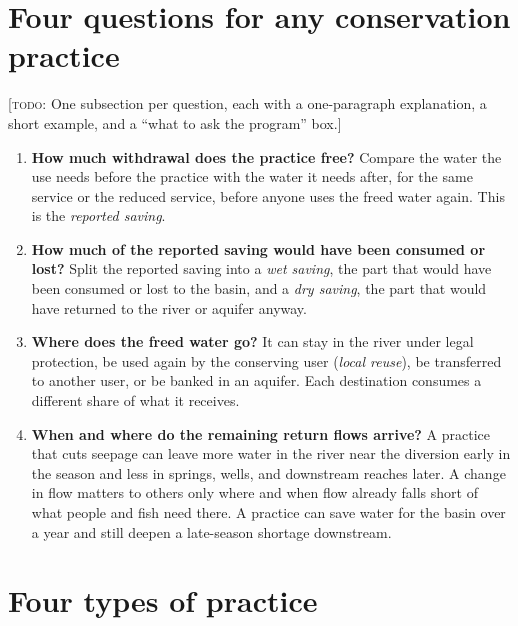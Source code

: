 \documentclass[11pt]{article}
\newcommand{\todo}[1]{\textcolor{orange!70!black}{[\textsc{todo}: #1]}}
\begin{document}
\section{Four questions for any conservation practice}\label{sec:questions}

\todo{One subsection per question, each with a one-paragraph explanation, a short example, and a ``what to ask the program'' box.}

\begin{enumerate}
  \item \textbf{How much withdrawal does the practice free?} Compare the water the use needs before the practice with the water it needs after, for the same service or the reduced service, before anyone uses the freed water again. This is the \emph{reported saving}.
  \item \textbf{How much of the reported saving would have been consumed or lost?} Split the reported saving into a \emph{wet saving}, the part that would have been consumed or lost to the basin, and a \emph{dry saving}, the part that would have returned to the river or aquifer anyway.
  \item \textbf{Where does the freed water go?} It can stay in the river under legal protection, be used again by the conserving user (\emph{local reuse}), be transferred to another user, or be banked in an aquifer. Each destination consumes a different share of what it receives.
  \item \textbf{When and where do the remaining return flows arrive?} A practice that cuts seepage can leave more water in the river near the diversion early in the season and less in springs, wells, and downstream reaches later. A change in flow matters to others only where and when flow already falls short of what people and fish need there. A practice can save water for the basin over a year and still deepen a late-season shortage downstream.
\end{enumerate}

\section{Four types of practice}\label{sec:types}
\end{document}
